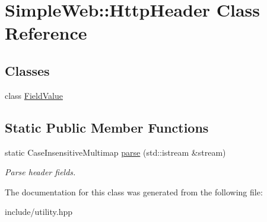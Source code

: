 \hypertarget{classSimpleWeb_1_1HttpHeader}{}\section{Simple\+Web\+:\+:Http\+Header Class Reference}
\label{classSimpleWeb_1_1HttpHeader}
\subsection*{Classes}
\begin{DoxyCompactItemize}
\item 
class \hyperlink{classSimpleWeb_1_1HttpHeader_1_1FieldValue}{Field\+Value}
\end{DoxyCompactItemize}
\subsection*{Static Public Member Functions}
\begin{DoxyCompactItemize}
\item 
static Case\+Insensitive\+Multimap \hyperlink{classSimpleWeb_1_1HttpHeader_addf976de338a6ba1138c77c7336a06d6}{parse} (std\+::istream \&stream)\hypertarget{classSimpleWeb_1_1HttpHeader_addf976de338a6ba1138c77c7336a06d6}{}\label{classSimpleWeb_1_1HttpHeader_addf976de338a6ba1138c77c7336a06d6}

\begin{DoxyCompactList}\small\item\em Parse header fields. \end{DoxyCompactList}\end{DoxyCompactItemize}


The documentation for this class was generated from the following file\+:\begin{DoxyCompactItemize}
\item 
include/utility.\+hpp\end{DoxyCompactItemize}
